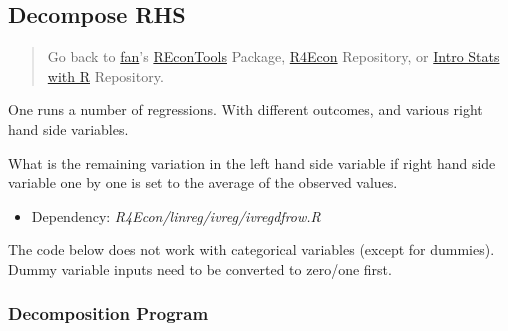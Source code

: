 \documentclass[
]{book}
\providecommand{\tightlist}{%
  \setlength{\itemsep}{0pt}\setlength{\parskip}{0pt}}
\begin{document}
\hypertarget{decompose-rhs}{%
\subsection{Decompose RHS}\label{decompose-rhs}}

\begin{quote}
Go back to \href{http://fanwangecon.github.io/CodeDynaAsset/}{fan}'s \href{https://fanwangecon.github.io/REconTools/}{REconTools} Package, \href{https://fanwangecon.github.io/R4Econ/}{R4Econ} Repository, or \href{https://fanwangecon.github.io/Stat4Econ/}{Intro Stats with R} Repository.
\end{quote}

One runs a number of regressions. With different outcomes, and various right hand side variables.

What is the remaining variation in the left hand side variable if right hand side variable one by one is set to the average of the observed values.

\begin{itemize}
\tightlist
\item
  Dependency: \emph{R4Econ/linreg/ivreg/ivregdfrow.R}
\end{itemize}

The code below does not work with categorical variables (except for dummies). Dummy variable inputs need to be converted to zero/one first.

\hypertarget{decomposition-program}{%
\subsubsection{Decomposition Program}\label{decomposition-program}}
\end{document}
